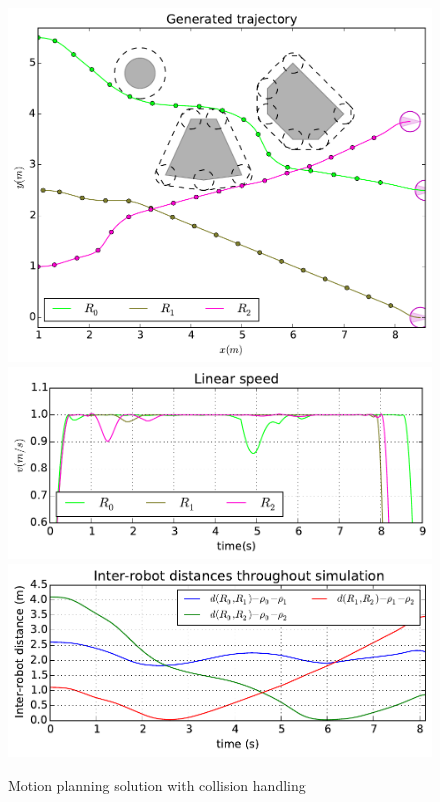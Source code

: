 \documentclass[eprint]{actapoly}
\begin{document}
\begin{figure}\centering
  \includegraphics[width=\linewidth]{./images/no_collision/new/multirobot-path.pdf} 
  \\[1mm]
  \includegraphics[width=\linewidth]{./images/no_collision/new/multirobot-vw.pdf} %
  \includegraphics[width=\linewidth]{./images/no_collision/new/multirobot-interr.pdf} %
  \caption{Motion planning solution with collision handling\label{fig:nocollision}}
\label{fig:res}
\end{figure}
\end{document}
